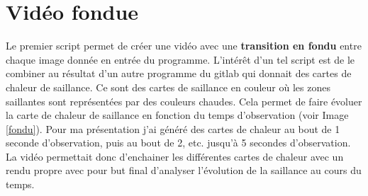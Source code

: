 \section{Vidéo fondue}

Le premier script permet de créer une vidéo avec une \textbf{transition en fondu} entre chaque image donnée en entrée du programme. L'intérêt d'un tel script est de le combiner au résultat d'un autre programme du gitlab qui donnait des cartes de chaleur de saillance. Ce sont des cartes de saillance en couleur où les zones saillantes sont représentées par des couleurs chaudes. Cela permet de faire évoluer la carte de chaleur de saillance en fonction du temps d'observation (voir Image \ref{fondu}). Pour ma présentation j'ai généré des cartes de chaleur au bout de 1 seconde d'observation, puis au bout de 2, etc. jusqu'à 5 secondes d'observation. La vidéo permettait donc d'enchainer les différentes cartes de chaleur avec un rendu propre avec pour but final d'analyser l'évolution de la saillance au cours du temps.

